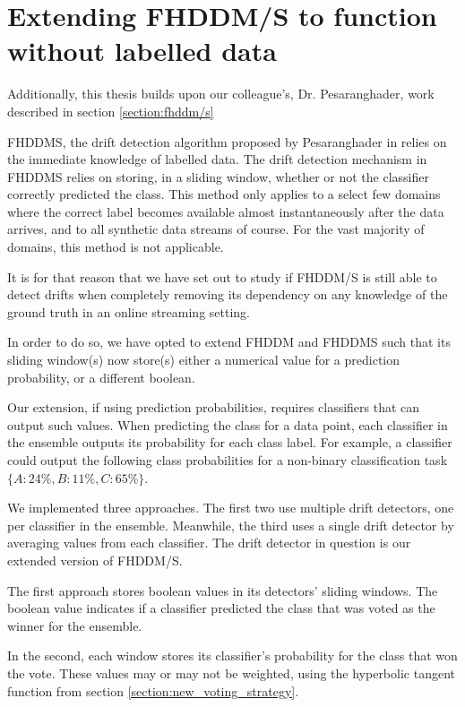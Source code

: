 \section{Extending FHDDM/S to function without labelled data}

Additionally, this thesis builds upon our colleague's, Dr. Pesaranghader, work described in section \ref{section:fhddm/s}

FHDDMS, the drift detection algorithm proposed by Pesaranghader in \cite{pesaranghader2016fast} relies on the immediate knowledge of labelled data. The drift detection mechanism in FHDDMS relies on storing, in a sliding window, whether or not the classifier correctly predicted the class. This method only applies to a select few domains where the correct label becomes available almost instantaneously after the data arrives, and to all synthetic data streams of course. For the vast majority of domains, this method is not applicable.

It is for that reason that we have set out to study if FHDDM/S is still able to detect drifts when completely removing its dependency on any knowledge of the ground truth in an online streaming setting.

In order to do so, we have opted to extend FHDDM and FHDDMS such that its sliding window(s) now store(s) either a numerical value for a prediction probability, or a different boolean.

Our extension, if using prediction probabilities, requires classifiers that can output such values. When predicting the class for a data point, each classifier in the ensemble outputs its probability for each class label. For example, a classifier could output the following class probabilities for a non-binary classification task $\{A: 24\%, B: 11\%, C: 65\%\}$.

We implemented three approaches. The first two use multiple drift detectors, one per classifier in the ensemble. Meanwhile, the third uses a single drift detector by averaging values from each classifier. The drift detector in question is our extended version of FHDDM/S.

The first approach stores boolean values in its detectors' sliding windows. The boolean value indicates if a classifier predicted the class that was voted as the winner for the ensemble.

In the second, each window stores its classifier's probability for the class that won the vote. These values may or may not be weighted, using the hyperbolic tangent function from section \ref{section:new_voting_strategy}.

